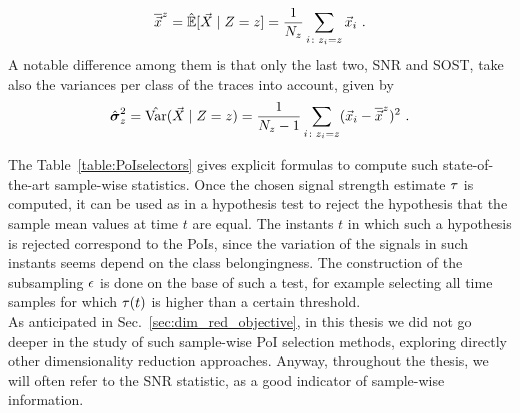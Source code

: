 \begin{equation}
\mmmXclass= \esperEst[\given{\vaLeakVec}{\sensRandVar = \sensVar}] = \frac{1}{\nbTracesPerClass}\sum_{i\colon \sensVar_i=\sensVar} \vLeakVec_i  \mbox{ .}
\end{equation} 
A notable difference among them is that only the last two, SNR and SOST, take also the variances per class of the traces into account, given by
\begin{equation}
\varXclass = \varEst(\given{\vaLeakVec}{\sensRandVar = \sensVar}) = \frac{1}{\nbTracesPerClass-1}\sum_{i\colon \sensVar_i=\sensVar} (\vLeakVec_i - \mmmXclass)^2 \mbox{ .}
\end{equation}

The Table~\ref{table:PoIselectors} gives explicit formulas to compute such state-of-the-art sample-wise statistics. Once the chosen signal strength estimate $\tau$ is computed, it can be used as in a hypothesis test to reject the hypothesis that the sample mean values at time $t$ are equal. The instants $t$ in which such a hypothesis is rejected correspond to the PoIs, since the variation of the signals in such instants seems depend on the class belongingness. The construction of the subsampling $\epsilon$ is done on the base of such a test, for example selecting all time samples for which $\tau(t)$ is higher than a certain threshold. \\

As anticipated in Sec.~\ref{sec:dim_red_objective}, in this thesis we did not go deeper in the study of such sample-wise PoI selection methods, exploring directly other dimensionality reduction approaches. Anyway, throughout the thesis, we will often refer to the SNR statistic, as a good indicator of sample-wise information.

